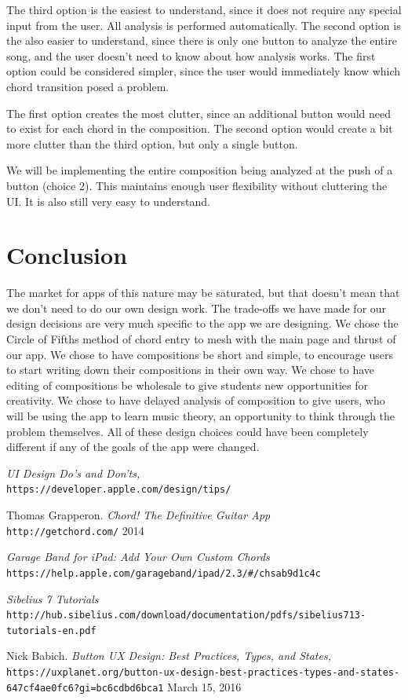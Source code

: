 \documentclass[onecolumn, draftclsnofoot,10pt, compsoc]{IEEEtran}
\begin{document}
The third option is the easiest to understand, since it does not require any special input from the user.
All analysis is performed automatically.
The second option is the also easier to understand, since there is only one button to analyze the entire song,
and the user doesn't need to know about how analysis works.
The first option could be considered simpler, since the user would immediately know which chord transition posed a problem.

The first option creates the most clutter, since an additional button would need to exist for each chord in the composition.
The second option would create a bit more clutter than the third option, but only a single button.

We will be implementing the entire composition being analyzed at the push of a button (choice 2).
This maintains enough user flexibility without cluttering the UI. It is also still very easy to understand.

\section{Conclusion}
The market for apps of this nature may be saturated, but that doesn't mean that we don't need to do our own design work.
The trade-offs we have made for our design decisions are very much specific to the app we are designing.
We chose the Circle of Fifths method of chord entry to mesh with the main page and thrust of our app.
We chose to have compositions be short and simple, to encourage users to start writing down their compositions in their own way.
We chose to have editing of compositions be wholesale to give students new opportunities for creativity.
We chose to have delayed analysis of composition to give users, who will be using the app to learn music theory, an opportunity to think through the problem themselves.
All of these design choices could have been completely different if any of the goals of the app were changed.

\begin{thebibliography}{9}
  \textit{UI Design Do's and Don'ts,}
  \\\texttt{https://developer.apple.com/design/tips/}

  Thomas Grapperon.
  \textit{Chord! The Definitive Guitar App}
  \\\texttt{http://getchord.com/}
  2014
  
  \textit{Garage Band for iPad: Add Your Own Custom Chords}
  \\\texttt{https://help.apple.com/garageband/ipad/2.3/\#/chsab9d1c4c}

  \textit{Sibelius 7 Tutorials}
  \\\texttt{http://hub.sibelius.com/download/documentation/pdfs/sibelius713-tutorials-en.pdf}

  Nick Babich.
  \textit{Button UX Design: Best Practices, Types, and States,}
  \\\texttt{https://uxplanet.org/button-ux-design-best-practices-types-and-states-647cf4ae0fc6?gi=bc6cdbd6bca1}
  March 15, 2016
  
\end{thebibliography}
\end{document}
